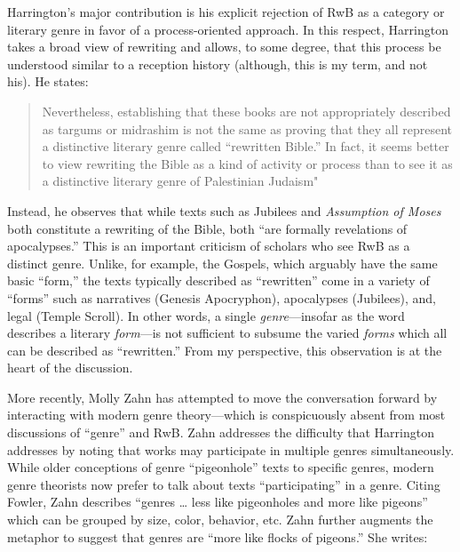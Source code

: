 Harrington's major contribution is his explicit rejection of RwB as a
category or literary genre in favor of a process-oriented approach. In
this respect, Harrington takes a broad view of rewriting and allows, to
some degree, that this process be understood similar to a reception
history (although, this is my term, and not his). He states:

\begin{quote}
Nevertheless, establishing that these books are not appropriately
described as targums or midrashim is not the same as proving that they
all represent a distinctive literary genre called ``rewritten Bible.''
In fact, it seems better to view rewriting the Bible as a kind of
activity or process than to see it as a distinctive literary genre of
Palestinian Judaism"
\autocite[242--243]{harrington_kraft-nickelsburg1986}
\end{quote}

Instead, he observes that while texts such as Jubilees and
\emph{Assumption of Moses} both constitute a rewriting of the Bible,
both ``are formally revelations of
apocalypses.''\autocite[243]{harrington_kraft-nickelsburg1986} This is
an important criticism of scholars who see RwB as a distinct genre.
Unlike, for example, the Gospels, which arguably have the same basic
``form,'' the texts typically described as ``rewritten'' come in a
variety of ``forms'' such as narratives (Genesis Apocryphon),
apocalypses (Jubilees), and, legal (Temple Scroll). In other words, a
single \emph{genre}---insofar as the word describes a literary
\emph{form}---is not sufficient to subsume the varied \emph{forms} which
all can be described as ``rewritten.'' From my perspective, this
observation is at the heart of the discussion.

More recently, Molly Zahn has attempted to move the conversation forward
by interacting with modern genre theory---which is conspicuously absent
from most discussions of ``genre'' and
RwB.\autocites{zahn_jbl2012}[Daniel Machiela noted the absence of genre
theory in his 2010 article, as well. See][]{machiela_jjs2010}[Another
notable exception is][]{brooke_dsd2010} Zahn addresses the difficulty
that Harrington addresses by noting that works may participate in
multiple genres simultaneously. While older conceptions of genre
``pigeonhole'' texts to specific genres, modern genre theorists now
prefer to talk about texts ``participating'' in a genre. Citing Fowler,
Zahn describes ``genres \ldots{} less like pigeonholes and more like
pigeons'' which can be grouped by size, color, behavior, etc. Zahn
further augments the metaphor to suggest that genres are ``more like
flocks of pigeons.'' She writes:

